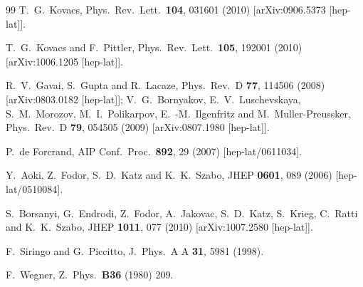 \documentclass[twocolumn, prd, preprintnumbers, amsmath,
  amssymb, showpacs, floatfix]{revtex4-1}
\begin{document}
\begin{thebibliography}{99}
  T.~G.~Kovacs,
  Phys.\ Rev.\ Lett.\  {\bf 104}, 031601 (2010)
  [arXiv:0906.5373 [hep-lat]].

  T.~G.~Kovacs and F.~Pittler,
  Phys.\ Rev.\ Lett.\  {\bf 105}, 192001 (2010)
  [arXiv:1006.1205 [hep-lat]].


  R.~V.~Gavai, S.~Gupta and R.~Lacaze,
  Phys.\ Rev.\ D {\bf 77}, 114506 (2008)
  [arXiv:0803.0182 [hep-lat]];
  V.~G.~Bornyakov, E.~V.~Luschevskaya, S.~M.~Morozov, M.~I.~Polikarpov,
  E.~-M.~Ilgenfritz and M.~Muller-Preussker,
  Phys.\ Rev.\ D {\bf 79}, 054505 (2009)
  [arXiv:0807.1980 [hep-lat]].

  P.~de Forcrand,
  AIP Conf.\ Proc.\  {\bf 892}, 29 (2007)
  [hep-lat/0611034].

  Y.~Aoki, Z.~Fodor, S.~D.~Katz and K.~K.~Szabo,
  JHEP {\bf 0601}, 089 (2006)
  [hep-lat/0510084].
 
  S.~Borsanyi, G.~Endrodi, Z.~Fodor, A.~Jakovac, S.~D.~Katz, S.~Krieg,
  C.~Ratti and K.~K.~Szabo, 
  JHEP {\bf 1011}, 077 (2010)
  [arXiv:1007.2580 [hep-lat]].

  F.~Siringo and G.~Piccitto,
  J.\ Phys.\ A A {\bf 31}, 5981 (1998).

  F.~Wegner,
  Z.\ Phys.\ {\bf B36} (1980) 209.



\end{thebibliography}
\end{document}
